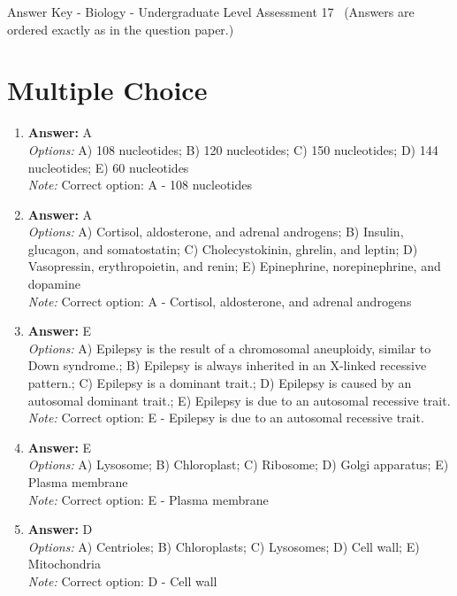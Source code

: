 \documentclass[12pt]{article}
\begin{document}
\begin{center}
Answer Key - Biology - Undergraduate Level Assessment 17 \
\small (Answers are ordered exactly as in the question paper.)
\end{center}

\section*{Multiple Choice}
\begin{enumerate}[label=\arabic*.]
\item \textbf{Answer:} A
\\ \textit{Options:} A) 108 nucleotides; B) 120 nucleotides; C) 150 nucleotides; D) 144 nucleotides; E) 60 nucleotides
\\ \textit{Note:} Correct option: A - 108 nucleotides
\item \textbf{Answer:} A
\\ \textit{Options:} A) Cortisol, aldosterone, and adrenal androgens; B) Insulin, glucagon, and somatostatin; C) Cholecystokinin, ghrelin, and leptin; D) Vasopressin, erythropoietin, and renin; E) Epinephrine, norepinephrine, and dopamine
\\ \textit{Note:} Correct option: A - Cortisol, aldosterone, and adrenal androgens
\item \textbf{Answer:} E
\\ \textit{Options:} A) Epilepsy is the result of a chromosomal aneuploidy, similar to Down syndrome.; B) Epilepsy is always inherited in an X-linked recessive pattern.; C) Epilepsy is a dominant trait.; D) Epilepsy is caused by an autosomal dominant trait.; E) Epilepsy is due to an autosomal recessive trait.
\\ \textit{Note:} Correct option: E - Epilepsy is due to an autosomal recessive trait.
\item \textbf{Answer:} E
\\ \textit{Options:} A) Lysosome; B) Chloroplast; C) Ribosome; D) Golgi apparatus; E) Plasma membrane
\\ \textit{Note:} Correct option: E - Plasma membrane
\item \textbf{Answer:} D
\\ \textit{Options:} A) Centrioles; B) Chloroplasts; C) Lysosomes; D) Cell wall; E) Mitochondria
\\ \textit{Note:} Correct option: D - Cell wall
\end{enumerate}
\end{document}
